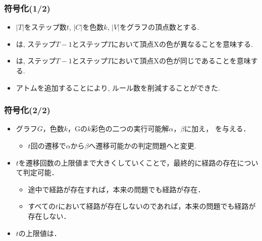 \documentclass[dvipdfmx,11pt]{beamer}
\begin{document}
\begin{frame}\frametitle{符号化(1/2)}

  \begin{itemize}
    \item $|T|$をステップ数$t$, $|C|$を色数$k$, $|V|$をグラフの頂点数とする.
    
  \end{itemize}

  \begin{table}[t]
    \centering
    
  \end{table}

  \begin{itemize}
    \item {}は, ステップ$T-1$とステップ$T$において頂点Xの色が異なることを意味する.
    \item {}は, ステップ$T-1$とステップ$T$において頂点Xの色が同じであることを意味する.
    \item アトムを追加することにより, ルール数を削減することができた.
  \end{itemize}

\end{frame}


\begin{frame}\frametitle{符号化(2/2)}

  \begin{itemize}
    \item グラフ$G$，色数$k$，Gの$k$彩色の二つの実行可能解$\alpha$，$\beta$に加え， を与える．
    \begin{itemize}
      \item $t$回の遷移で$\alpha$から$\beta$へ遷移可能かの判定問題へと変更. 
    \end{itemize}
    \item $t$を遷移回数の上限値まで大きくしていくことで，最終的に経路の存在について判定可能．
    \begin{itemize}
      \item 途中で経路が存在すれば，本来の問題でも経路が存在．
      \item すべての$t$において経路が存在しないのであれば，本来の問題でも経路が存在しない．
    \end{itemize}
    \item $t$の上限値は．
  \end{itemize}


  
\end{frame}
\end{document}
